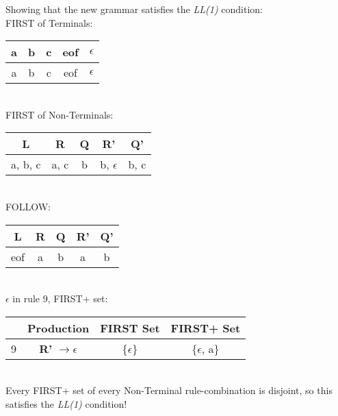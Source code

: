 \documentclass[11pt]{article} %
\begin{document}
\noindent Showing that the new grammar satisfies the \textit{LL(1)} condition: \\

\noindent FIRST of Terminals: \\

\begin{tabular}{|c|c|c|c|c|} \hline 
\textbf{a}
& \textbf{b}
& \textbf{c}
& \textbf{eof}
& \textbf{$\epsilon$}\\\hline 

a
& b
& c
& eof
& $\epsilon$\\\hline  
\end{tabular} \\

\noindent FIRST of Non-Terminals: \\

\begin{tabular}{|c|c|c|c|c|} \hline 
\textbf{L}
& \textbf{R}
& \textbf{Q}
& \textbf{R'}
& \textbf{Q'} \\\hline 

a, b, c
& a, c
& b
& b, $\epsilon$
& b, c \\\hline  
\end{tabular} \\

\noindent FOLLOW: \\

\begin{tabular}{|c|c|c|c|c|} \hline 
\textbf{L}
& \textbf{R}
& \textbf{Q}
& \textbf{R'}
& \textbf{Q'} \\\hline

eof
& a
& b
& a
& b \\\hline  
\end{tabular} \\

\noindent $\epsilon$ in rule 9, FIRST+ set: \\

\begin{tabular}{|c|c|c|c|} \hline 
& Production
& FIRST Set
& FIRST+ Set \\\hline

9
& \textbf{R'} $\rightarrow \epsilon$
& \{$\epsilon$\}
& \{$\epsilon$, a\} \\\hline 
\end{tabular}\\

\noindent Every FIRST+ set of every Non-Terminal rule-combination is disjoint, so this satisfies the \textit{LL(1)} condition!\\
\end{document}
